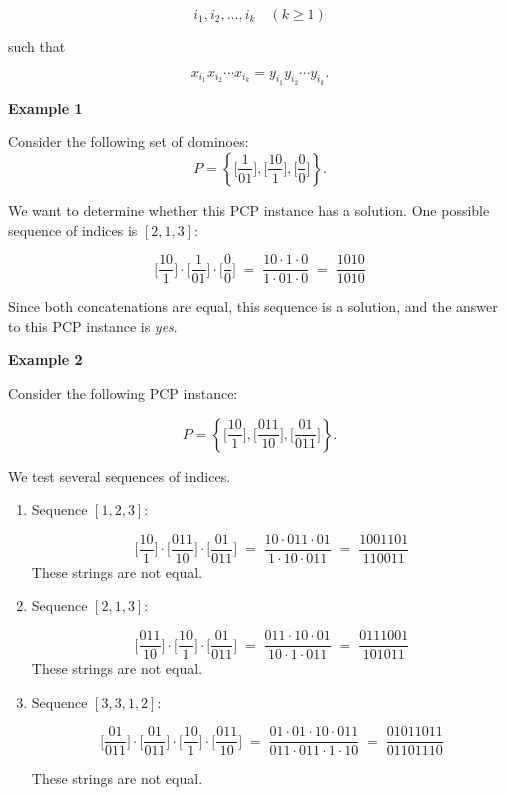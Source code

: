 \documentclass[12pt,a4paper,openany]{article}
\begin{document}
\[
i_1, i_2, \ldots, i_k \quad (k \geq 1)
\]

such that

\[
x_{i_1} x_{i_2} \cdots x_{i_k}
=
y_{i_1} y_{i_2} \cdots y_{i_k}.
\]


\textbf{Example 1}

Consider the following set of dominoes:
\[
P = \left\{
\bigg[\frac{1}{01}\bigg],
\bigg[\frac{10}{1}\bigg],
\bigg[\frac{0}{0}\bigg]
\right\}.
\]

We want to determine whether this PCP instance has a solution. One possible sequence of indices is $[2, 1, 3]$:

\[
\bigg[\frac{10}{1}\bigg]
\cdot
\bigg[\frac{1}{01}\bigg]
\cdot
\bigg[\frac{0}{0}\bigg]
\;=\;
\frac{10 \cdot 1 \cdot 0}{1 \cdot 01 \cdot 0}
\;=\;
\frac{1010}{1010}
\]

Since both concatenations are equal, this sequence is a solution, and the answer to this PCP instance is \emph{yes}.


\textbf{Example 2}

Consider the following PCP instance:

\[
P = \left\{
\bigg[\frac{10}{1}\bigg],
\bigg[\frac{011}{10}\bigg],
\bigg[\frac{01}{011}\bigg]
\right\}.
\]

We test several sequences of indices.

\begin{enumerate}
\item Sequence $[1,2,3]$:

\[
\bigg[\frac{10}{1}\bigg]
\cdot
\bigg[\frac{011}{10}\bigg]
\cdot
\bigg[\frac{01}{011}\bigg]
\;=\;
\frac{10 \cdot 011 \cdot 01}{1 \cdot 10 \cdot 011}
\;=\;
\frac{1001101}{110011}
\]
These strings are not equal.

\item Sequence $[2,1,3]$:

\[
\bigg[\frac{011}{10}\bigg]
\cdot
\bigg[\frac{10}{1}\bigg]
\cdot
\bigg[\frac{01}{011}\bigg]
\;=\;
\frac{011 \cdot 10 \cdot 01}{10 \cdot 1 \cdot 011}
\;=\;
\frac{0111001}{101011}
\]
These strings are not equal.

\item Sequence $[3,3,1,2]$:

\[
\bigg[\frac{01}{011}\bigg]
\cdot
\bigg[\frac{01}{011}\bigg]
\cdot
\bigg[\frac{10}{1}\bigg]
\cdot
\bigg[\frac{011}{10}\bigg]
\;=\;
\frac{01 \cdot 01 \cdot 10 \cdot 011}{011 \cdot 011 \cdot 1 \cdot 10}
\;=\;
\frac{01011011}{01101110}
\]

These strings are not equal.
\end{enumerate}
\end{document}
